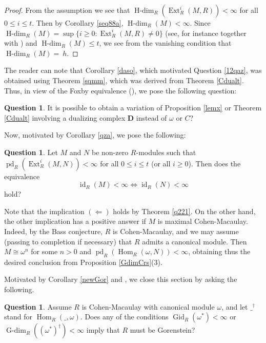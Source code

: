 \documentclass[11pt, a4paper,pagebackref]{amsart}
\numberwithin{equation}{section}
\theoremstyle{definition}
\newtheorem{remark and definition}[theorem]{Remark and Definition}
\newtheorem{remark and notation}[theorem]{Remark and Notation}
\newtheorem{question}[theorem]{Question}
\newcommand\Hom{\operatorname{Hom}}
\newcommand\Ext{\operatorname{Ext}}
\begin{document}
\begin{proof}
    From the assumption we see that $\operatorname{H-dim}_R(\Ext_R^i(M,R))<\infty$ for all $0 \leq i \leq t$. Then by Corollary \ref{seq88a}, $\operatorname{H-dim}_R(M)<\infty$. Since $\operatorname{H-dim}_R(M)=\sup\{i\geq 0: \Ext_R^i(M,R)\not=0\}$ (see, for instance \cite[Lemma 2.3(c)]{GorensteinDimensionAndTorsionOfModulesOverCommutativeNoetherianRings} together with \cite[Theorem 1.4]{Completeintersectiondimension}) and $\operatorname{H-dim}_R(M)\leq t$, we see from the vanishing condition that $\operatorname{H-dim}_R(M)=~h$.  
\end{proof}


The reader can note that Corollary \ref{daso}, which motivated Question \ref{12qaz}, was obtained using Theorem \ref{sqmm}, which was derived from Theorem \ref{Cdualt}. Thus, in view of  the Foxby equivalence (\cite[Theorem 3.3.2]{GorensteinDimensions}), we pose the following question:

\begin{question} It is possible to obtain a variation of Proposition \ref{lemx} or Theorem   \ref{Cdualt}  involving a dualizing complex $\boldsymbol{D}$ instead of $\omega$ or $C$?
\end{question}





Now, motivated by Corollary \ref{qza}, we pose the following:
\begin{question}\label{qaz}
    Let $M$ and $N$ be non-zero $R$-modules such that $\operatorname{pd}_R(\Ext_R^i(M,N))<\infty$ for all $0\leq i \leq t$ (or all $i \geq 0$). Then does the equivalence 
    $$\operatorname{id}_R(M)<\infty \Longleftrightarrow \operatorname{id}_R(N)<\infty$$ hold?
\end{question}
Note that the implication $(\Leftarrow)$ holds by Theorem \ref{q221}.  On the other hand, the other implication has a positive answer if $M$ is maximal Cohen-Macaulay. Indeed, by the Bass conjecture, $R$ is Cohen-Macaulay, and we may assume (passing to completion if necessary) that $R$ admits a canonical module. Then $M\cong \omega^n$ for some $n>0$ and $\operatorname{pd}_R(\Hom_R(\omega, N))<\infty$, obtaining thus the desired conclusion from Proposition \ref{GdimCrs}(3).


Motivated by Corollary \ref{newGor} and \cite[Corollary 5.13]{OnModulesWhoseDualIsOfFiniteGorensteinDimension}, we close this section by asking the following.

\begin{question}
Assume $R$ is Cohen-Macaulay with canonical module $\omega$, and let $\_^\dagger$ stand for $\Hom_R(\_,\omega)$. Does any of the conditions $\operatorname{Gid}_R(\omega^*)<\infty$ or $\operatorname{G-dim}_R((\omega^*)^\dagger)<\infty$  imply that $R$ must be Gorenstein?
\end{question}
\end{document}
